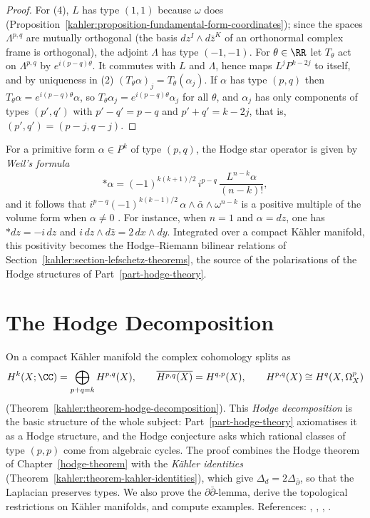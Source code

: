 \begin{proof}
For (4), $L$ has type $(1,1)$ because $\omega$ does (Proposition~\ref{kahler:proposition-fundamental-form-coordinates}); since the spaces
$\Lambda^{p,q}$ are mutually orthogonal (the basis $dz^I \wedge d\bar z^K$ of an orthonormal complex frame is orthogonal), the adjoint $\Lambda$ has
type $(-1,-1)$. For $\theta \in \RR$ let $T_\theta$ act on $\Lambda^{p,q}$ by $e^{i(p-q)\theta}$. It commutes with $L$ and $\Lambda$, hence maps
$L^jP^{k-2j}$ to itself, and by uniqueness in (2) $(T_\theta\alpha)_j = T_\theta(\alpha_j)$. If $\alpha$ has type $(p,q)$ then
$T_\theta\alpha = e^{i(p-q)\theta}\alpha$, so $T_\theta\alpha_j = e^{i(p-q)\theta}\alpha_j$ for all $\theta$, and $\alpha_j$ has only components of
types $(p', q')$ with $p' - q' = p - q$ and $p' + q' = k - 2j$, that is, $(p', q') = (p - j, q - j)$.
\end{proof}

\begin{remark}\label{kahler:remark-hodge-riemann-pointwise}
For a primitive form $\alpha \in P^k$ of type $(p,q)$, the Hodge star operator is given by \emph{Weil's formula}
\[
*\alpha = (-1)^{k(k+1)/2}\,i^{p-q}\,\frac{L^{n-k}\alpha}{(n-k)!},
\]
and it follows that $i^{p-q}(-1)^{k(k-1)/2}\,\alpha \wedge \bar\alpha \wedge \omega^{n-k}$ is a positive multiple of the volume form when
$\alpha \neq 0$ \cite[Section 1.2]{huybrechts-complex}. For instance, when $n = 1$ and $\alpha = dz$, one has $*dz = -i\,dz$ and
$i\,dz \wedge d\bar z = 2\,dx \wedge dy$. Integrated over a compact K\"ahler manifold, this positivity becomes the Hodge--Riemann bilinear relations of
Section~\ref{kahler:section-lefschetz-theorems}, the source of the polarisations of the Hodge structures of Part~\ref{part-hodge-theory}.
\end{remark}

\section{The Hodge Decomposition}\label{kahler:section-hodge-decomposition}
On a compact K\"ahler manifold the complex cohomology splits as
\[
H^k(X; \CC) = \bigoplus_{p+q=k}H^{p,q}(X), \qquad \overline{H^{p,q}(X)} = H^{q,p}(X), \qquad H^{p,q}(X) \cong H^q(X, \Omega^p_X)
\]
(Theorem~\ref{kahler:theorem-hodge-decomposition}). This \emph{Hodge decomposition} is the basic structure of the whole
subject: Part~\ref{part-hodge-theory} axiomatises it as a Hodge structure, and the Hodge conjecture asks which rational classes of type
$(p,p)$ come from algebraic cycles. The proof combines the Hodge theorem of Chapter~\ref{hodge-theorem} with the \emph{K\"ahler identities}
(Theorem~\ref{kahler:theorem-kahler-identities}), which give $\Delta_d = 2\Delta_{\bar\partial}$, so that the Laplacian
preserves types. We also prove the $\partial\bar\partial$-lemma, derive the topological restrictions on K\"ahler manifolds, and compute
examples. References: \cite[Chapter 0, Sections 6--7]{griffiths-harris}, \cite[Chapter 3]{huybrechts-complex},
\cite[Chapter 6]{voisin-hodge-1}, \cite[Chapter V]{wells-differential-analysis}.

